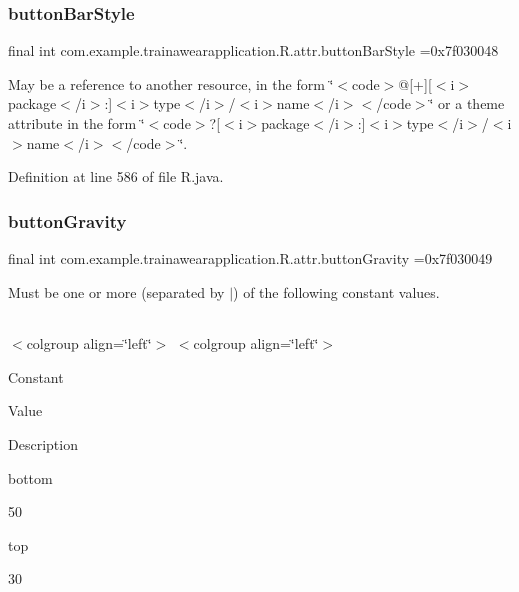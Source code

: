 \subsubsection{\texorpdfstring{buttonBarStyle}{buttonBarStyle}}
{\footnotesize\ttfamily final int com.\+example.\+trainawearapplication.\+R.\+attr.\+button\+Bar\+Style =0x7f030048\hspace{0.3cm}{\ttfamily [static]}}

May be a reference to another resource, in the form \char`\"{}$<$code$>$@\mbox{[}+\mbox{]}\mbox{[}$<$i$>$package$<$/i$>$\+:\mbox{]}$<$i$>$type$<$/i$>$/$<$i$>$name$<$/i$>$$<$/code$>$\char`\"{} or a theme attribute in the form \char`\"{}$<$code$>$?\mbox{[}$<$i$>$package$<$/i$>$\+:\mbox{]}$<$i$>$type$<$/i$>$/$<$i$>$name$<$/i$>$$<$/code$>$\char`\"{}. 

Definition at line 586 of file R.\+java.

\mbox{\label{classcom_1_1example_1_1trainawearapplication_1_1_r_1_1attr_a62b0b6c31844afd31cf388c1a2ff14b6}} 
\subsubsection{\texorpdfstring{buttonGravity}{buttonGravity}}
{\footnotesize\ttfamily final int com.\+example.\+trainawearapplication.\+R.\+attr.\+button\+Gravity =0x7f030049\hspace{0.3cm}{\ttfamily [static]}}

Must be one or more (separated by \textquotesingle{}$\vert$\textquotesingle{}) of the following constant values.

\tabulinesep=1mm
\begin{longtabu}spread 0pt [c]{*{0}{|X[-1]}|}
\hline
\end{longtabu}
$<$colgroup align=\char`\"{}left\char`\"{}$>$ $<$colgroup align=\char`\"{}left\char`\"{}$>$ 

Constant

Value

Description 

bottom

50

top

30


